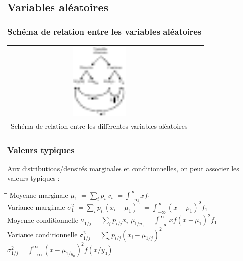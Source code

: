 \newpage
\subsection{Variables aléatoires}





\subsubsection{Schéma de relation entre les variables aléatoires}
\begin{center}
	\begin{tabular}{ccc}
		\includegraphics[width=0.3\textwidth]{images/schema_relation_va.pdf}\\
		Schéma de relation entre les différentes variables aléatoires
	\end{tabular}
\end{center}



\subsubsection{Valeurs typiques}
\label{valeurs-typiques}
Aux distributions/densités marginales et conditionnelles, on peut associer les valeurs typiques :
\begin{tabbing}
\hspace{5cm}\=\hspace{5cm}\=\kill
Moyenne marginale $\mu_1$       \> $= \displaystyle\sum_i p_{i.}x_i$            \> $= \displaystyle\int_{-\infty}^\infty xf_1$ \\ 
Variance marginale $\sigma_1^2$ \> $= \displaystyle\sum_i p_{i.} (x_i-\mu_1)^2$ \> $= \displaystyle\int_{-\infty}^\infty (x-\mu_1)^2 f_1$ \\
Moyenne conditionnelle          \> $\displaystyle\mu_{1/j} = \sum_i p_{i/j}x_i$              \> $\displaystyle\mu_{1/y_0} = \int_{-\infty}^\infty xf(x-\mu_1)^2f_1$\\
Variance conditionnelle         \> $\displaystyle\sigma^2_{1/j} = \sum_i p_{i/j}(x_i-\mu_{1/j})^2$ \> $\displaystyle\sigma^2_{1/j} = \int_{-\infty}^\infty (x - \mu_{1/y_0})^2 f(x/y_0)$\\
\end{tabbing}







